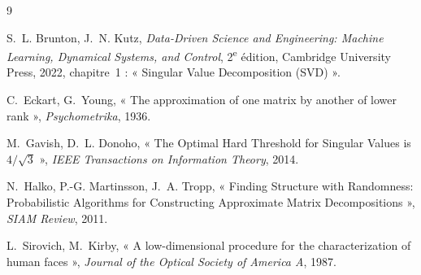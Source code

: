 \documentclass[11pt,a4paper]{article}
\begin{document}
\begin{thebibliography}{9}

S.~L. Brunton, J.~N. Kutz, \emph{Data-Driven Science and Engineering: Machine Learning, Dynamical Systems, and Control}, 2\textsuperscript{e} édition, Cambridge University Press, 2022, chapitre~1 : « Singular Value Decomposition (SVD) ».

C.~Eckart, G.~Young, « The approximation of one matrix by another of lower rank », \emph{Psychometrika}, 1936.

M.~Gavish, D.~L. Donoho, « The Optimal Hard Threshold for Singular Values is $4/\sqrt{3}$ », \emph{IEEE Transactions on Information Theory}, 2014.

N.~Halko, P.-G. Martinsson, J.~A. Tropp, « Finding Structure with Randomness: Probabilistic Algorithms for Constructing Approximate Matrix Decompositions », \emph{SIAM Review}, 2011.

L.~Sirovich, M.~Kirby, « A low-dimensional procedure for the characterization of human faces », \emph{Journal of the Optical Society of America A}, 1987.

\end{thebibliography}
\end{document}
